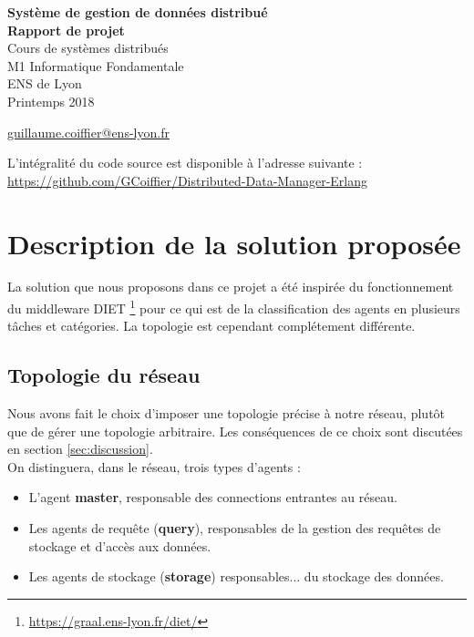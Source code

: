 \documentclass[a4paper]{article}
\begin{document}
\begin{titlepage}
\begin{center}
 {\Huge \bfseries Système de gestion de données distribué\\}
 \vspace{1cm}
 {\Large \bfseries Rapport de projet \\}
 \vspace{2cm}
 {\Large Cours de systèmes distribués \\ M1 Informatique Fondamentale \\ ENS de Lyon \\ Printemps 2018 \\}

 \vspace{2cm}

{\Large {} \color{black}
	\href{mailto:guillaume.coiffier@ens-lyon.fr}{guillaume.coiffier@ens-lyon.fr}\\
}

\vfill
L'intégralité du code source est disponible à l'adresse suivante : \\
\url{https://github.com/GCoiffier/Distributed-Data-Manager-Erlang}

\end{center}
\tableofcontents
\vspace{4cm}
\end{titlepage}

\section{Description de la solution proposée}
\label{sec:description}

La solution que nous proposons dans ce projet a été inspirée du fonctionnement du middleware DIET \footnote{\url{https://graal.ens-lyon.fr/diet/}}
pour ce qui est de la classification des agents en plusieurs tâches et catégories. La topologie est cependant complétement différente.

\subsection{Topologie du réseau}

Nous avons fait le choix d'imposer une topologie précise à notre réseau, plutôt que de gérer une topologie arbitraire.
Les conséquences de ce choix sont discutées en section \ref{sec:discussion}. \\
On distinguera, dans le réseau, trois types d'agents :
\begin{itemize}
\item L'agent \textbf{master}, responsable des connections entrantes au réseau.
\item Les agents de requête (\textbf{query}), responsables de la gestion des
requêtes de stockage et d'accès aux données.
\item Les agents de stockage (\textbf{storage}) responsables... du stockage des données.
\end{itemize}
\end{document}
